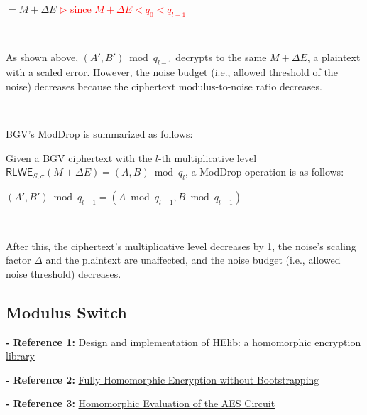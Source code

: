 $= M + \Delta E$ \textcolor{red}{ $\rhd$ since $M + \Delta E < q_0 < q_{l-1}$}

$ $

As shown above, $(A', B') \bmod q_{l-1}$ decrypts to the same $M + \Delta E$, a plaintext with a scaled error. However, the noise budget (i.e., allowed threshold of the noise) decreases because the ciphertext modulus-to-noise ratio decreases. 

$ $

BGV's \textsf{ModDrop} is summarized as follows:



\begin{tcolorbox}[title={\textbf{\tboxlabel{\ref*{subsec:bgv-moddrop}} BGV's \textsf{ModDrop}}}]

Given a BGV ciphertext with the $l$-th multiplicative level $\textsf{RLWE}_{S, \sigma}(M + \Delta E) = (A, B) \bmod q_l$, a \textsf{ModDrop} operation is as follows: 

$(A', B') \bmod q_{l-1} = (A \bmod q_{l-1}, B \bmod q_{l-1})$

$ $

After this, the ciphertext's multiplicative level decreases by 1, the noise's scaling factor $\Delta$ and the plaintext are unaffected, and the noise budget (i.e., allowed noise threshold) decreases. 

\end{tcolorbox}



\subsection{Modulus Switch}
\label{subsec:bgv-modulus-switch}

\noindent \textbf{- Reference 1:} 
\href{https://eprint.iacr.org/2020/1481}{Design and implementation of HElib: a homomorphic encryption library}~\cite{bgv-modswitch1}


\noindent \textbf{- Reference 2:} 
\href{https://eprint.iacr.org/2011/277.pdf}{Fully Homomorphic Encryption without Bootstrapping}~\cite{bgv-modswitch2}


\noindent \textbf{- Reference 3:} 
\href{https://eprint.iacr.org/2012/099.pdf}{Homomorphic Evaluation of the AES Circuit}~\cite{bgv-modswitch3}

